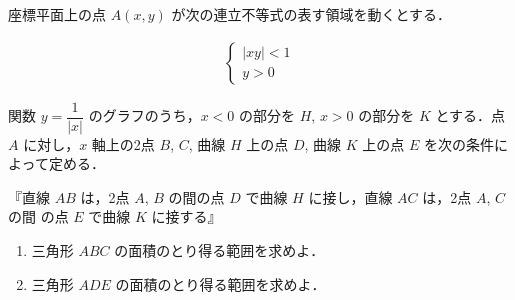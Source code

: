\documentclass[../../main.tex]{subfiles}
\begin{document}
座標平面上の点 $A(x,y)$ が次の連立不等式の表す領域を動くとする．

\begin{align}
  \begin{cases}
    |xy| < 1 \\
    y > 0
  \end{cases}
\end{align}

関数 $y = \dfrac{1}{|x|}$ のグラフのうち，$x < 0$ の部分を $H$, $x > 0$ の部分を $K$ とする．点 $A$ に対し，$x$ 軸上の2点 $B$, $C$, 曲線 $H$ 上の点 $D$, 曲線 $K$ 上の点 $E$ を次の条件によって定める．

『直線 $AB$ は，2点 $A$, $B$ の間の点 $D$ で曲線 $H$ に接し，直線 $AC$ は，2点 $A$, $C$ の間
の点 $E$ で曲線 $K$ に接する』

\begin{enumerate}
  \item 三角形 $ABC$ の面積のとり得る範囲を求めよ．
  \item 三角形 $ADE$ の面積のとり得る範囲を求めよ．
\end{enumerate}
\end{document}
